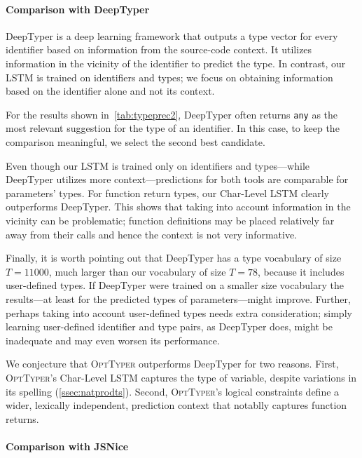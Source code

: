 \documentclass[sigplan,10pt,review,anonymous]{acmart} %
\newcommand{\projectname}{\textsc{OptTyper}\xspace}
\newcommand{\margincomment}[2]{\marginpar{\scriptsize\color{Maroon}#1 says: #2}}
\newcommand{\adg}[1]{\margincomment{ADG}{#1}}
\theoremstyle{plain}
\theoremstyle{remark}
\theoremstyle{definition}
\begin{document}
\paragraph{Comparison with DeepTyper}
DeepTyper is a deep learning framework that outputs a type vector for every identifier
based on information from the source-code context.
It utilizes information in the vicinity of the identifier to predict the type.
In contrast, our LSTM is trained on identifiers and types;
we focus on obtaining information based on the identifier alone and not its context.

For the results shown in~\cref{tab:typeprec2},
DeepTyper often returns \lstinline{any} as the most relevant suggestion for the type of an identifier.
In this case, to keep the comparison meaningful, we select the second best candidate.

Even though our LSTM is trained only on identifiers and types---while
DeepTyper utilizes more context---predictions for both tools are comparable for parameters' types.
For function return types, our Char-Level LSTM clearly outperforms DeepTyper.
This shows that taking into account information in the vicinity can be problematic;
function definitions may be placed relatively far away from their calls
and hence the context is not very informative.

Finally, it is worth pointing out that DeepTyper has a type vocabulary of size $T = 11000$,
much larger than our vocabulary of size $T=78$,
because it includes user-defined types.
If DeepTyper were trained on a smaller size vocabulary the results---at least for the predicted
types of parameters---might improve.
Further, perhaps taking into account user-defined types needs extra consideration;
simply learning user-defined identifier and type pairs, as DeepTyper does, might
be inadequate and may even worsen its performance.

We conjecture that \projectname outperforms DeepTyper for two reasons.  First, 
\projectname's Char-Level LSTM captures the type of variable, despite variations 
in its spelling (\cref{ssec:natprodts}).  Second, \projectname's logical constraints define
a wider, lexically independent, prediction context that notablly captures
function returns.

\paragraph{Comparison with JSNice}
\end{document}
